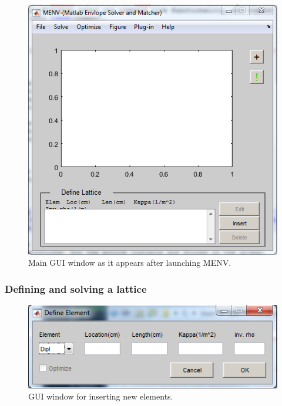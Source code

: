 \documentclass[../menv_main.tex]{subfiles}
\begin{document}
\begin{figure}
\centering
\includegraphics{figures/main_gui_window.png}
\caption{Main GUI window as it appears after launching MENV.}
\label{fig:main}
\end{figure}

\subsubsection{Defining and solving a lattice}



\begin{figure}
\centering
\includegraphics{figures/defElement_window.png}
\caption{GUI window for inserting new elements.}
\label{fig:defelement}
\end{figure}
\end{document}
